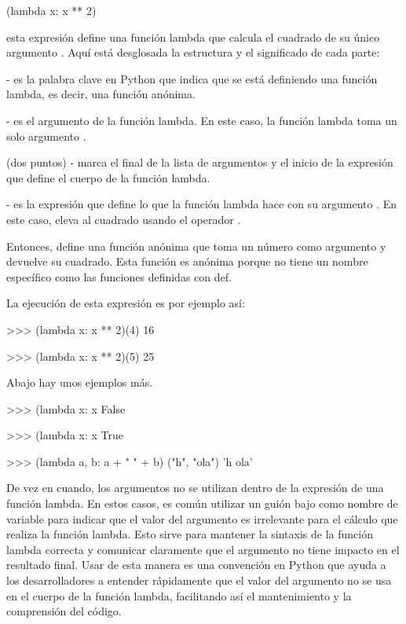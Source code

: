 \begin{python}
(lambda x: x ** 2)
\end{python}

esta expresión define una función lambda que calcula el cuadrado de su único argumento . Aquí está desglosada la estructura y el significado de cada parte:

 - es la palabra clave en Python que indica que se está definiendo una función lambda, es decir, una función anónima.

 - es el argumento de la función lambda. En este caso, la función lambda toma un solo argumento .

\fbox{\pythoninline{:}} (dos puntos) - marca el final de la lista de argumentos y el inicio de la expresión que define el cuerpo de la función lambda.

 - es la expresión que define lo que la función lambda hace con su argumento . En este caso, eleva  al cuadrado usando el 
operador \pythoninline{**}.

Entonces,  define una función anónima que toma un número como argumento  y devuelve su cuadrado. Esta función es anónima porque no tiene un nombre específico como las funciones definidas con def. 

La ejecución de esta expresión es por ejemplo así:

\begin{python}
>>> (lambda x: x ** 2)(4)
16

>>> (lambda x: x ** 2)(5)
25
\end{python}

Abajo hay unos ejemplos más.

\begin{python}
>>> (lambda x: x %
False

>>> (lambda x: x %
True

>>> (lambda a, b: a + " " + b) ("h", "ola")
'h ola'
\end{python}

De vez en cuando, los argumentos no se utilizan dentro de la expresión de una función lambda. En estos casos, es común utilizar un guión bajo \pythoninline{_} como nombre de variable para indicar que el valor del argumento es irrelevante para el cálculo que realiza la función lambda. Esto sirve para mantener la sintaxis de la función lambda correcta y comunicar claramente que el argumento no tiene impacto en el resultado final. Usar \pythoninline{_} de esta manera es una convención en Python que ayuda a los desarrolladores a entender rápidamente que el valor del argumento no se usa en el cuerpo de la función lambda, facilitando así el mantenimiento y la comprensión del código.

